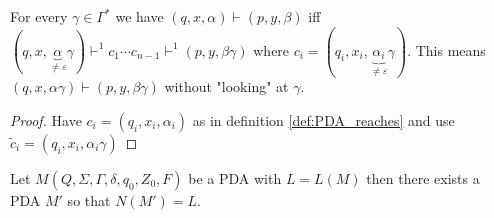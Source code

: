 \begin{theorem}\label{thm:PDA_reaches_unconsumed_stack}
  For every $\gamma\in\Gamma^*$ we have $(q,x,\alpha)\vdash(p,y,\beta)$ iff
  $(q,x,\underbrace{\alpha}_{\ne\varepsilon} \gamma)\vdash^1c_1\cdots c_{n-1}\vdash^1(p,y,\beta\gamma)$ where
  $c_i = (q_i,x_i,\underbrace{\alpha_i}_{\ne \varepsilon} \gamma)$. This means
  $(q,x,\alpha\gamma)\vdash(p,y,\beta\gamma)$ without "looking" at $\gamma$.
\end{theorem}
\begin{proof}
  Have $c_i = (q_i,x_i,\alpha_i)$ as in definition \ref{def:PDA_reaches} and use
  $\tilde{c}_i = (q_i,x_i,\alpha_i\gamma)$
\end{proof}
\begin{theorem}\label{thm:PDA_empty_stack_of_final_state}
  Let $M(Q,\Sigma,\Gamma,\delta,q_0,Z_0,F)$ be a PDA with $L=L(M)$ then there exists a PDA $M'$ so that $N(M')=L.$
\end{theorem}
